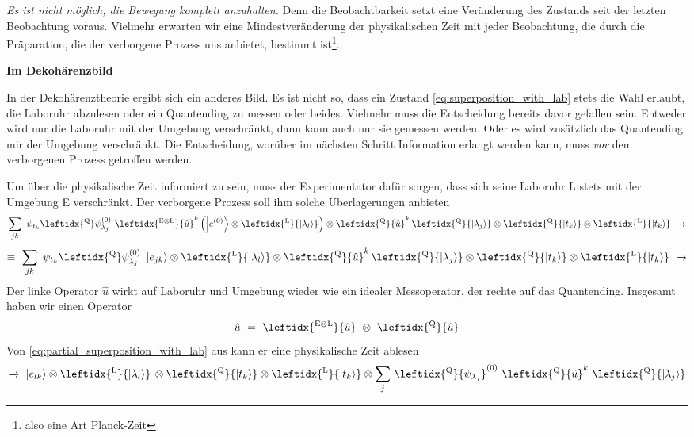 \documentclass[12pt]{article}
\begin{document}
\emph{Es ist nicht möglich, die Bewegung komplett anzuhalten.} Denn die Beobachtbarkeit setzt eine Veränderung des Zustands seit der letzten Beobachtung voraus. Vielmehr erwarten wir eine Mindestveränderung der physikalischen Zeit mit jeder Beobachtung, die durch die Präparation, die der verborgene Prozess uns anbietet, bestimmt ist\footnote{also eine Art Planck-Zeit}.

\textbf{Im Dekohärenzbild} 

In der Dekohärenztheorie ergibt sich ein anderes Bild. Es ist nicht so, dass ein Zustand \eqref{eq:superposition_with_lab} stets die Wahl erlaubt, die Laboruhr abzulesen oder ein Quantending zu messen oder beides. Vielmehr muss die Entscheidung bereits davor gefallen sein. Entweder wird nur die Laboruhr mit der Umgebung verschränkt, dann kann auch nur sie gemessen werden. Oder es wird zusätzlich das Quantending mir der Umgebung verschränkt. Die Entscheidung, worüber im nächsten Schritt Information erlangt werden kann, muss \emph{vor} dem verborgenen Prozess getroffen werden.

Um über die physikalische Zeit informiert zu sein, muss der Experimentator dafür sorgen, dass sich seine Laboruhr L stets mit der Umgebung E verschränkt. Der verborgene Prozess soll ihm solche Überlagerungen anbieten
\begin{equation*}
\sum_{jk} \ \psi_{t_k} \leftidx{^\mathrm{Q}}\psi_{\lambda_j}^{(0)}\ 
\leftidx{^\mathrm{E \otimes L}}{\hat{u}}^k \left( \ket{e^{(0)}} \otimes \leftidx{^\mathrm{L}}{\ket{\lambda_l}} \right) 
\otimes \leftidx{^\mathrm{Q}}{\hat{u}}^{k}\, \leftidx{^\mathrm{Q}}{\ket{\lambda_j}}
\otimes \leftidx{^\mathrm{Q}}{\ket{t_k}}
\otimes \leftidx{^\mathrm{L}}{\ket{t_k}}
\ \xrightarrow{}
\end{equation*}
\begin{equation}
\label{eq:partial_superposition_with_lab}
\equiv\ \sum_{jk} \ \psi_{t_k} \leftidx{^\mathrm{Q}}\psi_{\lambda_j}^{(0)}\ 
\ket{e_{jk}} 
\otimes \leftidx{^\mathrm{L}}{\ket{\lambda_l}} 
\otimes \leftidx{^\mathrm{Q}}{\hat{u}}^{k}\, \leftidx{^\mathrm{Q}}{\ket{\lambda_j}}
\otimes \leftidx{^\mathrm{Q}}{\ket{t_k}}
\otimes \leftidx{^\mathrm{L}}{\ket{t_k}}
\ \xrightarrow{}
\end{equation}
Der linke Operator $\hat{u}$ wirkt auf Laboruhr und Umgebung wieder wie ein idealer Messoperator, der rechte auf das Quantending. Insgesamt haben wir einen Operator
\begin{equation}
\label{eq:unitary_2_parts}
\hat{u}\ =\ \leftidx{^\mathrm{E \otimes L}}{\hat{u}}\ \otimes\ \leftidx{^\mathrm{Q}}{\hat{u}}
\end{equation}
Von \eqref{eq:partial_superposition_with_lab} aus kann er eine physikalische Zeit ablesen
\begin{equation*}
\xrightarrow{} \ \ket{e_{lk}} 
\otimes \leftidx{^\mathrm{L}}{\ket{\lambda_l}} \,
\otimes \leftidx{^\mathrm{Q}}{\ket{t_k}}
\otimes \leftidx{^\mathrm{L}}{\ket{t_k}}
\otimes \sum_{j} \, \leftidx{^\mathrm{Q}}{\psi_{\lambda_j}}^{(0)}\ 
\leftidx{^\mathrm{Q}}{\hat{u}}^{k}\ 
\leftidx{^\mathrm{Q}}{\ket{\lambda_j}}
\end{equation*}
\end{document}
